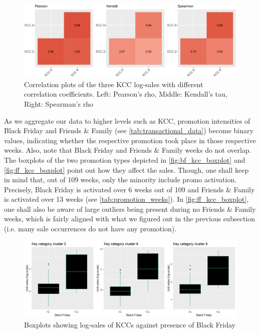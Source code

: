 \begin{figure}[H]
\centering
  \includegraphics[width=0.95\linewidth]{figures/corplot_kcc.eps}
  \caption{Correlation plots of the three \ac{KCC} log-sales with different correlation coefficients. Left: Pearson's rho, Middle: Kendall's tau, Right: Spearman's rho}
  \label{fig:corplot_kcc}
\end{figure}



 
As we aggregate our data to higher levels such as \ac{KCC}, promotion intensities of Black Friday and Friends \& Family (see \autoref{tab:transactional_data}) become binary values, indicating whether the respective promotion took place in those respective weeks. Also, note that Black Friday and Friends \& Family weeks do not overlap. The boxplots of the two promotion types depicted in \autoref{fig:bf_kcc_boxplot} and \autoref{fig:ff_kcc_boxplot} point out how they affect the sales. Though, one shall keep in mind that, out of 109 weeks, only the minority include promo activation. Precisely, Black Friday is activated over 6 weeks out of 109 and Friends \& Family is activated over 13 weeks
(see \autoref{tab:promotion_weeks}). In \autoref{fig:ff_kcc_boxplot}, one shall also be aware of large outliers being present during no Friends \& Family weeks, which is fairly aligned with what we figured out in the previous subsection (i.e. many sale occurrences do not have any promotion).
\\


\begin{figure}[H]
\centering
  \includegraphics[width=0.95\linewidth]{figures/bf_kcc_boxplot.png}
  \caption{Boxplots showing log-sales of KCCs against presence of Black Friday}
  \label{fig:bf_kcc_boxplot}
\end{figure}


